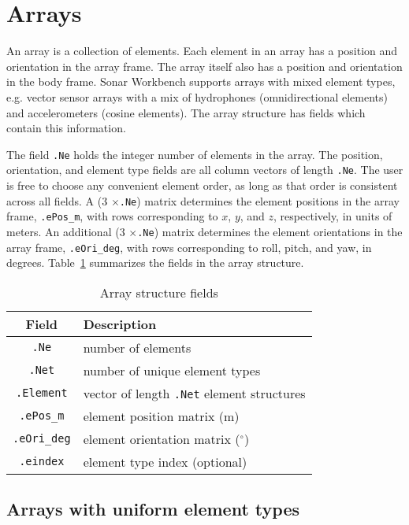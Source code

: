 \section{Arrays}\label{sec:array}

An array is a collection of elements. Each element in an array has a position and orientation in the array frame. The array itself also has a position and orientation in the body frame. Sonar Workbench supports arrays with mixed element types, e.g. vector sensor arrays with a mix of hydrophones (omnidirectional elements) and accelerometers (cosine elements). The array structure has fields which contain this information.

The field \texttt{.Ne} holds the integer number of elements in the array. The position, orientation, and element type fields are all column vectors of length \texttt{.Ne}. The user is free to choose any convenient element order, as long as that order is consistent across all fields. A (3 $\times$\texttt{.Ne}) matrix determines the element positions in the array frame, \texttt{.ePos\_m}, with rows corresponding to $x$, $y$, and $z$, respectively, in units of meters. An additional (3 $\times$\texttt{.Ne}) matrix determines the element orientations in the array frame, \texttt{.eOri\_deg}, with rows corresponding to roll, pitch, and yaw, in degrees. Table~\ref{tab:ArrayFields} summarizes the fields in the array structure. 

\begin{table}[!ht]
	\begin{center}
		\caption{Array structure fields}
		\label{tab:ArrayFields}
		\begin{tabular}{c|l} 
			\textbf{Field} & \textbf{Description} \\
			\hline
			\texttt{.Ne} & number of elements \\
			\texttt{.Net} & number of unique element types \\
			\texttt{.Element} & vector of length \texttt{.Net} element structures \\
			\texttt{.ePos\_m} & element position matrix (m) \\
			\texttt{.eOri\_deg} & element orientation matrix ($^\circ$) \\
			\texttt{.eindex} & element type index (optional) \\
		\end{tabular}
	\end{center}
\end{table}

\subsection{Arrays with uniform element types}

